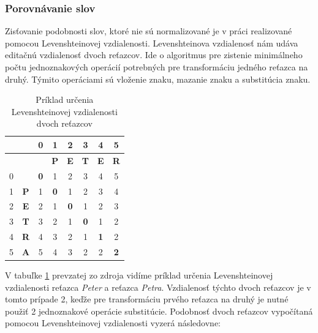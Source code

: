 \subsubsection{Porovnávanie slov}
Zisťovanie podobnosti slov, ktoré nie sú normalizované je v práci realizované pomocou 
Levenshteinovej vzdialenosti. Levenshteinova vzdialenosť nám udáva editačnú vzdialenosť 
dvoch reťazcov. Ide o algoritmus pre zistenie minimálneho počtu jednoznakových operácií 
potrebných pre transformáciu jedného reťazca na druhý. Týmito operáciami sú vloženie 
znaku, mazanie znaku a substitúcia znaku.

\begin {table}[ht]
\begin{center}
\begin{tabular}{ |c|c|c|c|c|c|c|c|} 
\hline
  &            &      0     & 1          & 2          & 3          & 4          & 5          \\ \hline
  &            &            & \textbf{P} & \textbf{E} & \textbf{T} & \textbf{E} & \textbf{R} \\ \hline
0 &            & \textbf{0} &      1     &      2     &     3      &      4     &      5     \\ \hline
1 & \textbf{P} &      1     & \textbf{0} &      1     &     2      &      3     &      4     \\ \hline
2 & \textbf{E} &      2     &      1     & \textbf{0} &     1      &      2     &      3     \\ \hline
3 & \textbf{T} &      3     &      2     &      1     &\textbf{0}  &      1     &      2     \\ \hline
4 & \textbf{R} &      4     &      3     &      2     &     1      & \textbf{1} &      2     \\ \hline
5 & \textbf{A} &      5     &      4     &      3     &     2      &      2     & \textbf{2} \\ \hline

\hline
\end{tabular}
\caption {Príklad určenia Levenshteinovej vzdialenosti dvoch reťazcov} \label{levenshtein}
\end{center}
\end {table}

V tabuľke \ref{levenshtein} prevzatej zo zdroja \cite{formalniDP} vidíme príklad určenia Levenshteinovej vzdialenosti reťazca \textit{Peter} a reťazca \textit{Petra}. Vzdialenosť týchto dvoch reťazcov je v tomto prípade 2, keďže pre transformáciu 
prvého reťazca na druhý je nutné použiť 2 jednoznakové operácie substitúcie. Podobnosť 
dvoch reťazcov vypočítaná pomocou Levenshteinovej vzdialenosti vyzerá následovne:

